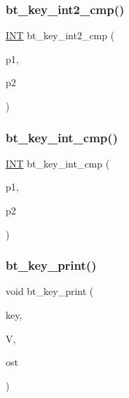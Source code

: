 \mbox{\label{bt__key_8_c_adb4aba47b9f77ae05a9312c9c3cad58e}} 
\subsubsection{\texorpdfstring{bt\+\_\+key\+\_\+int2\+\_\+cmp()}{bt\_key\_int2\_cmp()}}
{\footnotesize\ttfamily \mbox{\hyperlink{galois_8h_a09fddde158a3a20bd2dcadb609de11dc}{I\+NT}} bt\+\_\+key\+\_\+int2\+\_\+cmp (\begin{DoxyParamCaption}\item[{\mbox{\hyperlink{galois_8h_ab6cc7b4aeb6ea31aba2b3fbfc83ff5e6}{B\+Y\+TE}} $\ast$}]{p1,  }\item[{\mbox{\hyperlink{galois_8h_ab6cc7b4aeb6ea31aba2b3fbfc83ff5e6}{B\+Y\+TE}} $\ast$}]{p2 }\end{DoxyParamCaption})}

\mbox{\label{bt__key_8_c_a7d03b4040fd1fb79bc15af9e907c975f}} 
\subsubsection{\texorpdfstring{bt\+\_\+key\+\_\+int\+\_\+cmp()}{bt\_key\_int\_cmp()}}
{\footnotesize\ttfamily \mbox{\hyperlink{galois_8h_a09fddde158a3a20bd2dcadb609de11dc}{I\+NT}} bt\+\_\+key\+\_\+int\+\_\+cmp (\begin{DoxyParamCaption}\item[{\mbox{\hyperlink{galois_8h_ab6cc7b4aeb6ea31aba2b3fbfc83ff5e6}{B\+Y\+TE}} $\ast$}]{p1,  }\item[{\mbox{\hyperlink{galois_8h_ab6cc7b4aeb6ea31aba2b3fbfc83ff5e6}{B\+Y\+TE}} $\ast$}]{p2 }\end{DoxyParamCaption})}

\mbox{\label{bt__key_8_c_a14b2a3662044cca4e54d45f271c947aa}} 
\subsubsection{\texorpdfstring{bt\+\_\+key\+\_\+print()}{bt\_key\_print()}}
{\footnotesize\ttfamily void bt\+\_\+key\+\_\+print (\begin{DoxyParamCaption}\item[{\mbox{\hyperlink{galois_8h_ab6cc7b4aeb6ea31aba2b3fbfc83ff5e6}{B\+Y\+TE}} $\ast$}]{key,  }\item[{\mbox{\hyperlink{class_vector}{Vector}} \&}]{V,  }\item[{ostream \&}]{ost }\end{DoxyParamCaption})}

